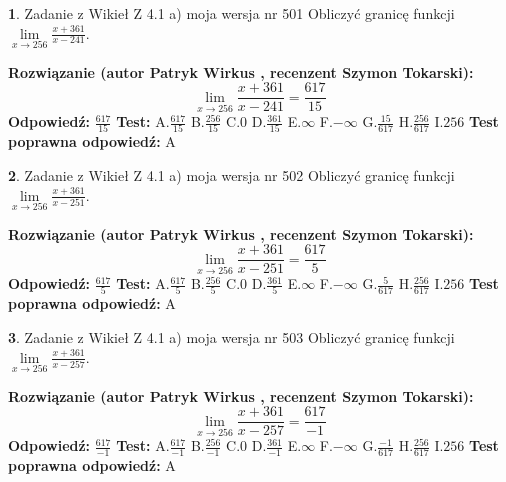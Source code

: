 \documentclass[12pt, a4paper]{article}
\theoremstyle{definition} %
\newtheorem{zad}{}
\newcommand{\zadStart}[1]{\begin{zad}#1\newline}
\newcommand{\zadStop}{\end{zad}}
\newcommand{\rozwStart}[2]{\noindent \textbf{Rozwiązanie (autor #1 , recenzent #2): }\newline}
\newcommand{\rozwStop}{\newline}
\newcommand{\odpStart}{\noindent \textbf{Odpowiedź:}\newline}
\newcommand{\odpStop}{\newline}
\newcommand{\testStart}{\noindent \textbf{Test:}\newline}
\newcommand{\testStop}{\newline}
\newcommand{\kluczStart}{\noindent \textbf{Test poprawna odpowiedź:}\newline}
\newcommand{\kluczStop}{\newline}
\begin{document}
\zadStart{Zadanie z Wikieł Z 4.1 a) moja wersja nr 501}
Obliczyć granicę funkcji $\lim\limits_{x\to256}\frac{x+361}{x-241}$.
\zadStop
\rozwStart{Patryk Wirkus}{Szymon Tokarski}
$$\lim\limits_{x\to256}\frac{x+361}{x-241} = \frac{617}{15}$$
\rozwStop
\odpStart
$\frac{617}{15}$
\odpStop
\testStart
A.$\frac{617}{15}$
B.$\frac{256}{15}$
C.$0$
D.$\frac{361}{15}$
E.$\infty$
F.$-\infty$
G.$\frac{15}{617}$
H.$\frac{256}{617}$
I.$256$
\testStop
\kluczStart
A
\kluczStop



\zadStart{Zadanie z Wikieł Z 4.1 a) moja wersja nr 502}
Obliczyć granicę funkcji $\lim\limits_{x\to256}\frac{x+361}{x-251}$.
\zadStop
\rozwStart{Patryk Wirkus}{Szymon Tokarski}
$$\lim\limits_{x\to256}\frac{x+361}{x-251} = \frac{617}{5}$$
\rozwStop
\odpStart
$\frac{617}{5}$
\odpStop
\testStart
A.$\frac{617}{5}$
B.$\frac{256}{5}$
C.$0$
D.$\frac{361}{5}$
E.$\infty$
F.$-\infty$
G.$\frac{5}{617}$
H.$\frac{256}{617}$
I.$256$
\testStop
\kluczStart
A
\kluczStop



\zadStart{Zadanie z Wikieł Z 4.1 a) moja wersja nr 503}
Obliczyć granicę funkcji $\lim\limits_{x\to256}\frac{x+361}{x-257}$.
\zadStop
\rozwStart{Patryk Wirkus}{Szymon Tokarski}
$$\lim\limits_{x\to256}\frac{x+361}{x-257} = \frac{617}{-1}$$
\rozwStop
\odpStart
$\frac{617}{-1}$
\odpStop
\testStart
A.$\frac{617}{-1}$
B.$\frac{256}{-1}$
C.$0$
D.$\frac{361}{-1}$
E.$\infty$
F.$-\infty$
G.$\frac{-1}{617}$
H.$\frac{256}{617}$
I.$256$
\testStop
\kluczStart
A
\kluczStop
\end{document}

